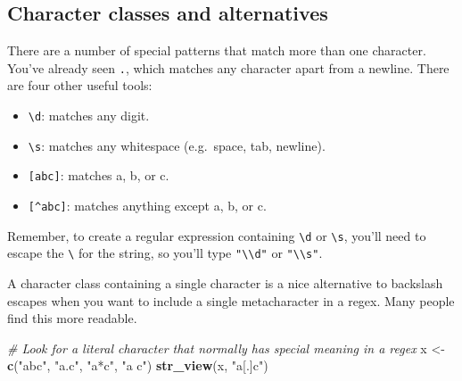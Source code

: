 \documentclass[]{book}
\newenvironment{Shaded}{\begin{snugshade}}{\end{snugshade}}
\newcommand{\KeywordTok}[1]{\textcolor[rgb]{0.13,0.29,0.53}{\textbf{#1}}}
\newcommand{\StringTok}[1]{\textcolor[rgb]{0.31,0.60,0.02}{#1}}
\newcommand{\CommentTok}[1]{\textcolor[rgb]{0.56,0.35,0.01}{\textit{#1}}}
\newcommand{\NormalTok}[1]{#1}
\providecommand{\tightlist}{%
  \setlength{\itemsep}{0pt}\setlength{\parskip}{0pt}}
\begin{document}
\hypertarget{htmlwidget-59f2370825da36350af1}{}

\begin{Shaded}
\end{Shaded}

\hypertarget{htmlwidget-3ec749e04bfb96c2d6c3}{}

\subsection{Character classes and
alternatives}\label{character-classes-and-alternatives}

There are a number of special patterns that match more than one
character. You've already seen \texttt{.}, which matches any character
apart from a newline. There are four other useful tools:

\begin{itemize}
\tightlist
\item
  \texttt{\textbackslash{}d}: matches any digit.
\item
  \texttt{\textbackslash{}s}: matches any whitespace (e.g.~space, tab,
  newline).
\item
  \texttt{{[}abc{]}}: matches a, b, or c.
\item
  \texttt{{[}\^{}abc{]}}: matches anything except a, b, or c.
\end{itemize}

Remember, to create a regular expression containing
\texttt{\textbackslash{}d} or \texttt{\textbackslash{}s}, you'll need to
escape the \texttt{\textbackslash{}} for the string, so you'll type
\texttt{"\textbackslash{}\textbackslash{}d"} or
\texttt{"\textbackslash{}\textbackslash{}s"}.

A character class containing a single character is a nice alternative to
backslash escapes when you want to include a single metacharacter in a
regex. Many people find this more readable.

\begin{Shaded}
\begin{Highlighting}[]
\CommentTok{# Look for a literal character that normally has special meaning in a regex}
\NormalTok{x <-}\StringTok{ }\KeywordTok{c}\NormalTok{(}\StringTok{"abc"}\NormalTok{, }\StringTok{"a.c"}\NormalTok{, }\StringTok{"a*c"}\NormalTok{, }\StringTok{"a c"}\NormalTok{)}
\KeywordTok{str_view}\NormalTok{(x, }\StringTok{"a[.]c"}\NormalTok{)}
\end{Highlighting}
\end{Shaded}
\end{document}
